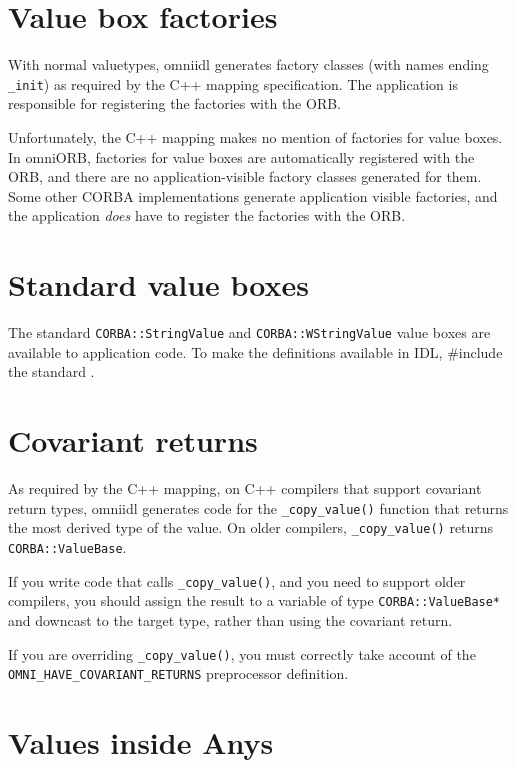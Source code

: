 \documentclass[11pt,twoside,a4paper]{book}
\newcommand{\type}[1]{\texttt{#1}}
\newcommand{\code}[1]{\texttt{#1}}
\newcommand{\op}[1]{\texttt{#1()}}
\newcommand{\file}{\begingroup \urlstyle{tt}\Url}
\begin{document}
\section{Value box factories}

With normal valuetypes, omniidl generates factory classes (with names
ending \code{\_init}) as required by the C++ mapping specification.
The application is responsible for registering the factories with the
ORB.

Unfortunately, the C++ mapping makes no mention of factories for value
boxes. In omniORB, factories for value boxes are automatically
registered with the ORB, and there are no application-visible factory
classes generated for them. Some other CORBA implementations generate
application visible factories, and the application \emph{does} have to
register the factories with the ORB.


\section{Standard value boxes}

The standard \type{CORBA::StringValue} and \type{CORBA::WStringValue}
value boxes are available to application code. To make the definitions
available in IDL, \#include the standard \file{orb.idl}.


\section{Covariant returns}

As required by the C++ mapping, on C++ compilers that support
covariant return types, omniidl generates code for the
\op{\_copy\_value} function that returns the most derived type of the
value. On older compilers, \op{\_copy\_value} returns
\type{CORBA::ValueBase}.

If you write code that calls \op{\_copy\_value}, and you need to
support older compilers, you should assign the result to a variable of
type \type{CORBA::ValueBase*} and downcast to the target type, rather
than using the covariant return.

If you are overriding \op{\_copy\_value}, you must correctly take
account of the \code{OMNI\_HAVE\_COVARIANT\_RETURNS} preprocessor
definition.



\section{Values inside Anys}
\end{document}
